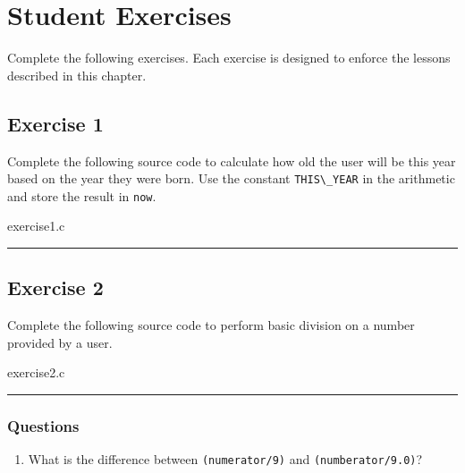 \section{Student Exercises}

Complete the following exercises. Each exercise is designed to enforce the
lessons described in this chapter.


\subsection{Exercise 1}
Complete the following source code to calculate how old the user will be this
year based on the year they were born. Use the constant \verb|THIS\_YEAR| in
the arithmetic and store the result in \verb|now|.

\begin{code}{exercise1.c}

\end{code}
\footnotesize

\rule{\textwidth}{0.1pt}


\subsection{Exercise 2}
Complete the following source code to perform basic division on a number
provided by a user.

\begin{code}{exercise2.c}

\end{code}
\footnotesize

\rule{\textwidth}{0.1pt}

\subsubsection{Questions}

\begin{enumerate}
\item What is the difference between \verb|(numerator/9)| and
      \verb|(numberator/9.0)|?
\end{enumerate}
